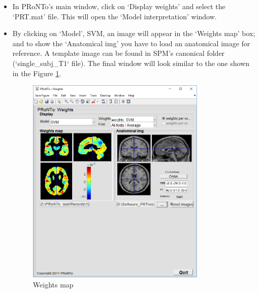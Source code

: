 \begin{itemize}
	
	\item In PRoNTo's main window, click on `Display weights' and select the `PRT.mat' file. This will open the `Model interpretation' window.
	
	\item By clicking on `Model', SVM, an image will appear in the `Weights map' box; and to show the `Anatomical img' you have to load an anatomical image for reference. A template image can be found in SPM's canonical folder (`single\_subj\_T1` file). The final window will look similar to the one shown in the Figure \ref{fig:weights_map}.
	
\begin{figure}[h!]
	\centering
		\includegraphics[height=10cm]{images/Tutorial/classification/prt_weights_covariates}
	\caption{Weights map}
	\label{fig:weights_map}
\end{figure}

	
\end{itemize}

